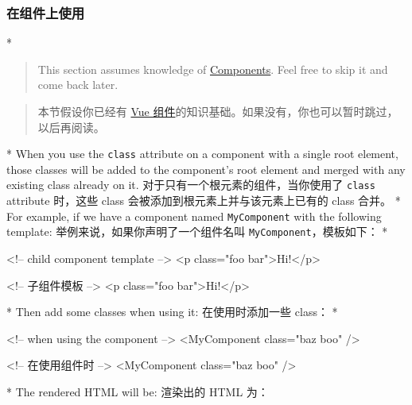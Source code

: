 \begin{paracol}{2}
\subsubsection{在组件上使用}
\switchcolumn[0]*%
\begin{quote}
This section assumes knowledge of
\href{https://vuejs.org/guide/essentials/component-basics.html}{Components}.
Feel free to skip it and come back later.
\end{quote}
\switchcolumn
\begin{quote}
本节假设你已经有
\href{https://cn.vuejs.org/guide/essentials/component-basics.html}{Vue
组件}的知识基础。如果没有，你也可以暂时跳过，以后再阅读。
\end{quote}
\switchcolumn[0]*%
When you use the \texttt{class} attribute on a component with a single
root element, those classes will be added to the component's root
element and merged with any existing class already on it.
\switchcolumn
对于只有一个根元素的组件，当你使用了 \texttt{class} attribute 时，这些
class 会被添加到根元素上并与该元素上已有的 class 合并。
\switchcolumn[0]*%
For example, if we have a component named \texttt{MyComponent} with the
following template:
\switchcolumn
举例来说，如果你声明了一个组件名叫 \texttt{MyComponent}，模板如下：
\switchcolumn[0]*%
\begin{codeHtml}
<!-- child component template -->
<p class="foo bar">Hi!</p>
\end{codeHtml}
\switchcolumn
\begin{codeHtml}
<!-- 子组件模板 -->
<p class="foo bar">Hi!</p>
\end{codeHtml}
\switchcolumn[0]*%
Then add some classes when using it:
\switchcolumn
在使用时添加一些 class：
\switchcolumn[0]*%
\begin{codeHtml}
<!-- when using the component -->
<MyComponent class="baz boo" />
\end{codeHtml}
\switchcolumn
\begin{codeHtml}
<!-- 在使用组件时 -->
<MyComponent class="baz boo" />
\end{codeHtml}
\switchcolumn[0]*%
The rendered HTML will be:
\switchcolumn
渲染出的 HTML 为：


\end{paracol}
